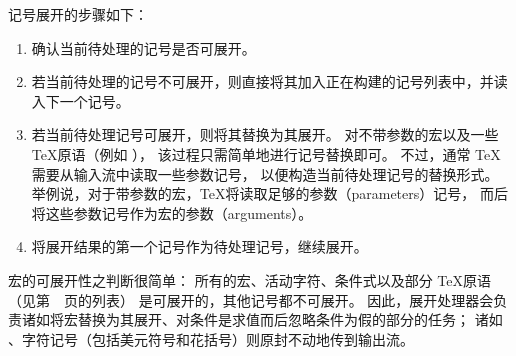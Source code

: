 \documentclass{book}
\begin{document}
记号展开的步骤如下：
\begin{enumerate}
\item 确认当前待处理的记号是否可展开。
\item 若当前待处理的记号不可展开，则直接将其加入正在构建的记号列表中，并读入下一个记号。

\item 若当前待处理记号可展开，则将其替换为其展开。
      对不带参数的宏以及一些 \TeX 原语（例如 ），
      该过程只需简单地进行记号替换即可。
      不过，通常 \TeX 需要从输入流中读取一些参数记号，
      以便构造当前待处理记号的替换形式。
      举例说，对于带参数的宏，\TeX 将读取足够的参数（parameters）记号，
      而后将这些参数记号作为宏的参数（arguments）。

%
\item 将展开结果的第一个记号作为待处理记号，继续展开。
\end{enumerate}
宏的可展开性之判断很简单：
所有的宏、活动字符、条件式以及部分 \TeX 原语（见第~\pageref{expand:lijst}~页的列表）
是可展开的，其他记号都不可展开。
因此，展开处理器会负责诸如将宏替换为其展开、对条件是求值而后忽略条件为假的部分的任务；
诸如 、字符记号（包括美元符号和花括号）则原封不动地传到输出流。
\end{document}
